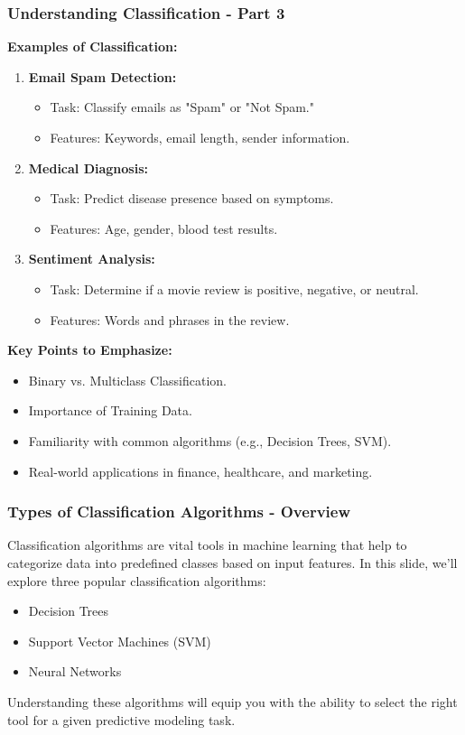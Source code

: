 \documentclass{beamer}
\begin{document}
\begin{frame}[fragile]
    \frametitle{Understanding Classification - Part 3}
    \textbf{Examples of Classification:}
    \begin{enumerate}
        \item \textbf{Email Spam Detection:}
            \begin{itemize}
                \item Task: Classify emails as "Spam" or "Not Spam."
                \item Features: Keywords, email length, sender information.
            \end{itemize}
        \item \textbf{Medical Diagnosis:}
            \begin{itemize}
                \item Task: Predict disease presence based on symptoms.
                \item Features: Age, gender, blood test results.
            \end{itemize}
        \item \textbf{Sentiment Analysis:}
            \begin{itemize}
                \item Task: Determine if a movie review is positive, negative, or neutral.
                \item Features: Words and phrases in the review.
            \end{itemize}
    \end{enumerate}

    \textbf{Key Points to Emphasize:}
    \begin{itemize}
        \item Binary vs. Multiclass Classification.
        \item Importance of Training Data.
        \item Familiarity with common algorithms (e.g., Decision Trees, SVM).
        \item Real-world applications in finance, healthcare, and marketing.
    \end{itemize}
\end{frame}

\begin{frame}[fragile]
    \frametitle{Types of Classification Algorithms - Overview}
    Classification algorithms are vital tools in machine learning that help to categorize data into predefined classes based on input features. In this slide, we'll explore three popular classification algorithms:
    \begin{itemize}
        \item Decision Trees
        \item Support Vector Machines (SVM)
        \item Neural Networks
    \end{itemize}
    Understanding these algorithms will equip you with the ability to select the right tool for a given predictive modeling task.
\end{frame}
\end{document}
